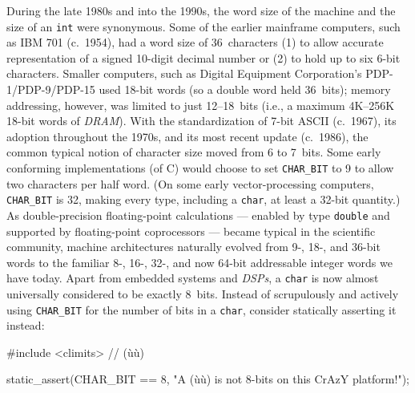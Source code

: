 During the late 1980s and into the 1990s, the word size of the machine and
the size of an \lstinline!int! were synonymous. Some of
the earlier mainframe computers, such as IBM 701 (c.~1954), had a word
size of 36~characters (1) to allow accurate representation of a signed
10-digit decimal number or (2) to hold up to six 6-bit characters.
Smaller computers, such as Digital Equipment Corporation's
PDP-1/PDP-9/PDP-15 used 18-bit words (so a double word held 36~bits);
memory addressing, however, was limited to just 12--18~bits (i.e., a
maximum 4K--256K 18-bit words of \emph{DRAM}). With the standardization
of 7-bit ASCII (c.~1967), its adoption throughout the 1970s, and its most
recent update (c.~1986), the common typical notion of character size
moved from 6 to 7~bits. Some early conforming implementations (of C)
would choose to set \lstinline!CHAR_BIT! to 9 to allow two characters
per half word. (On some early vector-processing computers,
\lstinline!CHAR_BIT! is 32, making every type, including a
\lstinline!char!, at least a 32-bit quantity.) As double-precision floating-point calculations --- enabled by type \lstinline!double! and supported by floating-point coprocessors --- became typical in the scientific community, machine architectures
naturally evolved from 9-, 18-, and 36-bit words to the familiar 8-,
16-, 32-, and now 64-bit addressable integer words we have today.
Apart from embedded systems and \emph{DSPs}, a \lstinline!char! is now
almost universally considered to be exactly 8~bits. Instead of
scrupulously and actively using \lstinline!CHAR_BIT! for the number of bits
in a \lstinline!char!, consider statically asserting it instead:

\begin{emcppshiddenlisting}[emcppsbatch=e7]
#include <climits>  // (ù{}ù)
\end{emcppshiddenlisting}
\begin{emcppslisting}[emcppsbatch=e7]
static_assert(CHAR_BIT == 8, "A (ù{}ù) is not 8-bits on this CrAzY platform!");
\end{emcppslisting}

